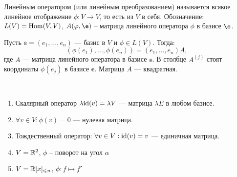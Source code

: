 \begin{Def}
    Линейным оператором (или линейным преобразованием) называется всякое линейное отображение $\phi \colon V \rightarrow V$, то есть из $V$ в себя. Обозначение: $L(V) = \mathrm{Hom}(V, V)$, $A(\phi, \e)$ -- матрица линейного оператора $\phi$ в базисе $\e$.
\end{Def}

\par Пусть $\mathbb{e} = (e_1, \ldots, e_n)$ --- базис в $V$ и $\phi \in L(V)$. Тогда:
$$
\left(\phi(e_1), \ldots, \phi(e_n)\right) = \left(e_1, \ldots, e_n\right)A,
$$
где $A$ --- матрица линейного оператора в базисе $\mathbb{e}$. В столбце $A^{\left( j\right)}$ стоят координаты $\phi(e_j)$ в базисе $\mathbb{e}$. Матрица $A$ --- квадратная. 
\begin{Examples}\
    \begin{enumerate}
        \item Скалярный оператор $\lambda \mathrm{id}(v) = \lambda V$ --- матрица $\lambda E$ в любом базисе.
        \item $\forall v \in V : \phi(v) = 0$ --- нулевая матрица.
        \item Тождественный оператор: $\forall v \in V : \mathrm{id}(v) = v$ --- единичная матрица.
        \item $V = \mathbb{R}^2$, $\phi$ -- поворот на угол $\alpha$
        \item $V = \mathbb{R}[x]_{\leqslant n}$, $\phi: f \mapsto f'$
    \end{enumerate}
\end{Examples}

